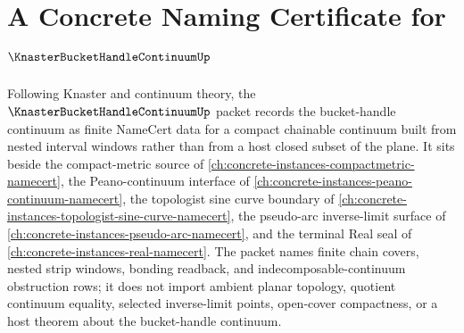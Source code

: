\chapter{A Concrete Naming Certificate for $\KnasterBucketHandleContinuumUp$}
\label{ch:concrete-instances-knaster-bucket-handle-continuum-namecert}

Following Knaster and continuum theory, the $\KnasterBucketHandleContinuumUp$ packet records the bucket-handle continuum as finite NameCert data for a compact chainable continuum built from nested interval windows rather than from a host closed subset of the plane. It sits beside the compact-metric source of \autoref{ch:concrete-instances-compactmetric-namecert}, the Peano-continuum interface of \autoref{ch:concrete-instances-peano-continuum-namecert}, the topologist sine curve boundary of \autoref{ch:concrete-instances-topologist-sine-curve-namecert}, the pseudo-arc inverse-limit surface of \autoref{ch:concrete-instances-pseudo-arc-namecert}, and the terminal Real seal of \autoref{ch:concrete-instances-real-namecert}. The packet names finite chain covers, nested strip windows, bonding readback, and indecomposable-continuum obstruction rows; it does not import ambient planar topology, quotient continuum equality, selected inverse-limit points, open-cover compactness, or a host theorem about the bucket-handle continuum.

